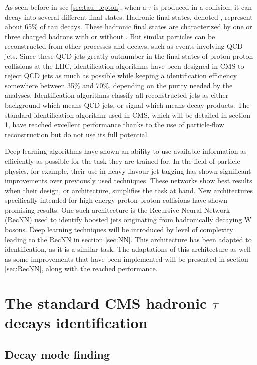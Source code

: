 
As seen before in sec \ref{sec:tau_lepton}, when a $\tau$ is produced in a collision, it can decay into several different final states.
Hadronic final states, denoted \tauh, represent about 65\% of tau decays.
These hadronic final states are characterized by one or three charged hadrons with or without \pizero . But similar particles can be reconstructed from other processes and decays, such as events involving QCD jets.
Since these QCD jets greatly outnumber \tauh in the final states of proton-proton collisions at the LHC, \tauh identification algorithms have been designed in CMS to reject QCD jets as much as possible while keeping a \tauh identification efficiency somewhere between 35\% and 70\%, depending on the purity needed by the analyses. Identification algorithms classify all reconstructed jets as either background which means QCD jets, or signal which means \tauh decay products.
The standard \tauh identification algorithm used in CMS, which will be detailed in section \ref{sec:std_tau_id}, have reached excellent performance thanks to the use of particle-flow reconstruction but do not use its full potential. 

Deep learning algorithms have shown an ability to use available information as efficiently as possible for the task they are trained for. In the field of particle physics, for example, their use in heavy flavour jet-tagging \cite{btagging_NN} has shown significant improvements over previously used techniques. These networks show best results when their design, or architecture, simplifies the task at hand. New architectures specifically intended for high energy proton-proton collisions have shown promising results. One such architecture is the Recursive Neural Network (RecNN) \cite{Louppe:2017ipp} used to identify boosted jets originating from hadronically decaying W bosons. Deep learning techniques will be introduced by level of complexity leading to the RecNN in section \ref{sec:NN}. This architecture has been adapted to \tauh identification, as it is a similar task. The adaptations of this architecture as well as some improvements that have been implemented will be presented in section \ref{sec:RecNN}, along with the reached performance.

\section{The standard CMS hadronic $\tau$ decays identification}
\label{sec:std_tau_id}
\subsection{Decay mode finding}

